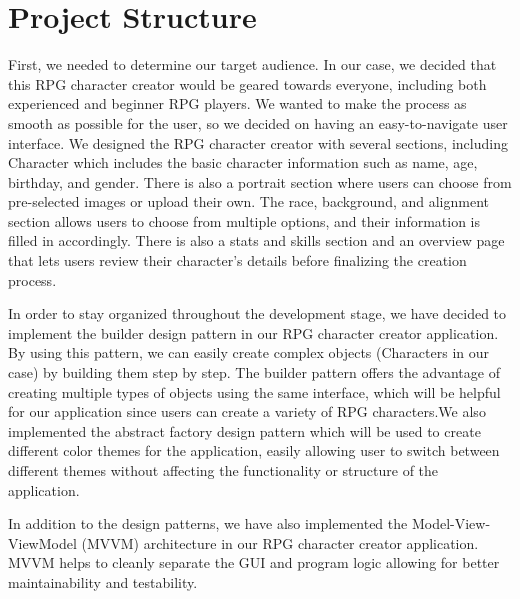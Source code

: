 \documentclass[10pt,conference,onecolumn,compsoc]{IEEEtran}
\begin{document}
\section{Project Structure}
	First, we needed to determine our target audience. In our case, we decided that this RPG character creator would be geared towards everyone, including both experienced and beginner RPG players. We wanted to make the process as smooth as possible for the user, so we decided on having an easy-to-navigate user interface. We designed the RPG character creator with several sections, including Character which includes the basic character information such as name, age, birthday, and gender. There is also a portrait section where users can choose from pre-selected images or upload their own. The race, background, and alignment section allows users to choose from multiple options, and their information is filled in accordingly. There is also a stats and skills section and an overview page that lets users review their character's details before finalizing the creation process.
	
	In order to stay organized throughout the development stage, we have decided to implement the builder design pattern in our RPG character creator application. By using this pattern, we can easily create complex objects (Characters in our case) by building them step by step. The builder pattern offers the advantage of creating multiple types of objects using the same interface, which will be helpful for our application since users can create a variety of RPG characters.We also implemented the abstract factory design pattern which will be used to create different color themes for the application, easily allowing user to switch between different themes without affecting the functionality or structure of the application.
	
In addition to the design patterns, we have also implemented the Model-View-ViewModel (MVVM) architecture in our RPG character creator application. MVVM helps to cleanly separate the GUI and program logic allowing for better maintainability and testability.
\end{document}
